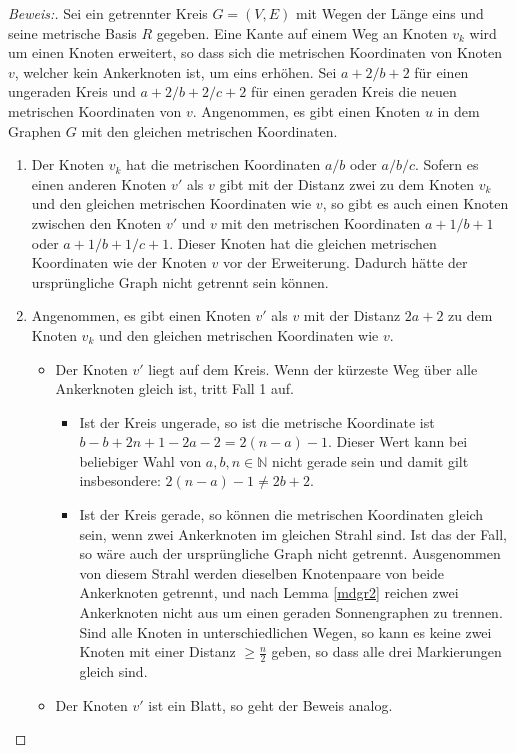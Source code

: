 \begin{proof}[Beweis:]
Sei ein getrennter Kreis $G=(V,E)$ mit Wegen der Länge eins und seine metrische Basis $R$ gegeben. Eine Kante auf einem Weg an Knoten $v_k$ wird um einen Knoten erweitert, so dass sich die metrischen Koordinaten von Knoten $v$, welcher kein Ankerknoten ist, um eins erhöhen. Sei $a+2/b+2$ für einen ungeraden Kreis und $a+2/b+2/c+2$ für einen geraden Kreis die neuen metrischen Koordinaten von $v$. Angenommen, es gibt einen Knoten $u$ in dem Graphen $G$ mit den gleichen metrischen Koordinaten.
\begin{enumerate}
\item Der Knoten $v_k$ hat die metrischen Koordinaten $a/b$ oder $a/b/c$. Sofern es einen anderen Knoten $v'$ als $v$ gibt mit der Distanz zwei zu dem Knoten $v_k$ und den gleichen metrischen Koordinaten wie $v$, so gibt es auch einen Knoten zwischen den Knoten $v'$ und $v$ mit den metrischen Koordinaten $a+1/b+1$ oder $a+1/b+1/c+1$. Dieser Knoten hat die gleichen metrischen Koordinaten wie der Knoten $v$ vor der Erweiterung. Dadurch hätte der ursprüngliche Graph nicht getrennt sein können.
\item Angenommen, es gibt einen Knoten $v'$ als $v$ mit der Distanz $2a+2$ zu dem Knoten $v_k$ und den gleichen metrischen Koordinaten wie $v$.
\begin{itemize}
\item Der Knoten $v'$ liegt auf dem Kreis. Wenn der kürzeste Weg über alle Ankerknoten gleich ist, tritt Fall 1 auf.
\begin{itemize}
\item Ist der Kreis ungerade, so ist die metrische Koordinate ist $b-b+2n+1-2a-2=2(n-a)-1$. Dieser Wert kann bei beliebiger Wahl von $a,b,n \in \mathbb{N}$ nicht gerade sein und damit gilt insbesondere: $2(n-a)-1\neq 2b+2$. 
\item Ist der Kreis gerade, so können die metrischen Koordinaten gleich sein, wenn zwei Ankerknoten im gleichen Strahl sind. Ist das der Fall, so wäre auch der ursprüngliche Graph nicht getrennt. Ausgenommen von diesem Strahl werden dieselben Knotenpaare von beide Ankerknoten getrennt, und nach Lemma \ref{mdgr2} reichen zwei Ankerknoten nicht aus um einen geraden Sonnengraphen zu trennen. Sind alle Knoten in unterschiedlichen Wegen, so kann es keine zwei Knoten mit einer Distanz $\geq \frac{n}{2}$ geben, so dass alle drei Markierungen gleich sind.
\end{itemize}
\item Der Knoten $v'$ ist ein Blatt, so geht der Beweis analog.

\end{itemize}
\end{enumerate}
\end{proof}
